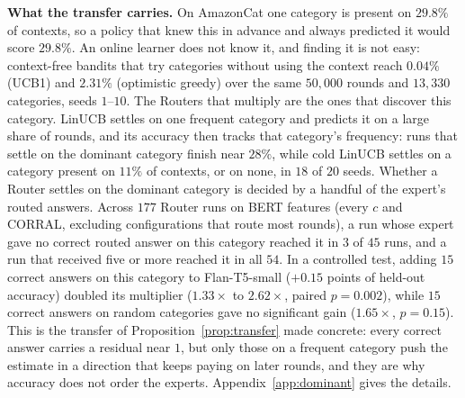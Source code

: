 \documentclass{article}
\theoremstyle{definition}
\theoremstyle{remark}
\theoremstyle{remark}
\begin{document}
\textbf{What the transfer carries.} On AmazonCat one category is present on
$29.8\%$ of contexts, so a policy that knew this in advance and always
predicted it would score $29.8\%$. An online learner does not know it, and
finding it is not easy: context-free bandits that try categories without
using the context reach $0.04\%$ (UCB1) and $2.31\%$ (optimistic greedy) over
the same $50{,}000$ rounds and $13{,}330$ categories, seeds $1$--$10$. The
Routers that multiply are the ones that discover this category. LinUCB
settles on one frequent category and predicts it on a large share of rounds,
and its accuracy then tracks that category's frequency: runs that settle on
the dominant category finish near $28\%$, while cold LinUCB settles on a
category present on $11\%$ of contexts, or on none, in $18$ of $20$ seeds.
Whether a Router settles on the dominant category is decided by a handful of
the expert's routed answers. Across $177$ Router runs on BERT features (every
$c$ and CORRAL, excluding configurations that route most rounds), a run whose
expert gave no correct routed answer on this category reached it in $3$ of
$45$ runs, and a run that received five or more reached it in all $54$. In a
controlled test, adding $15$ correct answers on this category to
Flan-T5-small ($+0.15$ points of held-out accuracy) doubled its multiplier
($1.33\times$ to $2.62\times$, paired $p=0.002$), while $15$ correct answers on
random categories gave no significant gain ($1.65\times$, $p=0.15$). This is
the transfer of Proposition~\ref{prop:transfer} made concrete: every correct
answer carries a residual near $1$, but only those on a frequent category push
the estimate in a direction that keeps paying on later rounds, and they are
why accuracy does not order the experts. Appendix~\ref{app:dominant} gives the
details.
\end{document}

